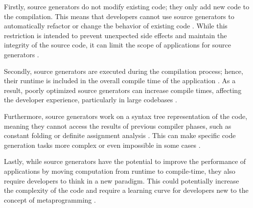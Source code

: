 Firstly, source generators do not modify existing code; they only add new code to the compilation. This means that developers cannot use source generators to automatically refactor or change the behavior of existing code \cite{CSharpRoslyn}. While this restriction is intended to prevent unexpected side effects and maintain the integrity of the source code, it can limit the scope of applications for source generators \cite{Carter2020}.

Secondly, source generators are executed during the compilation process; hence, their runtime is included in the overall compile time of the application \cite{CSharpRoslyn}. As a result, poorly optimized source generators can increase compile times, affecting the developer experience, particularly in large codebases \cite{Carter2020}.

Furthermore, source generators work on a syntax tree representation of the code, meaning they cannot access the results of previous compiler phases, such as constant folding or definite assignment analysis \cite{Torgersen2020}. This can make specific code generation tasks more complex or even impossible in some cases \cite{CSharpRoslyn}.

Lastly, while source generators have the potential to improve the performance of applications by moving computation from runtime to compile-time, they also require developers to think in a new paradigm. This could potentially increase the complexity of the code and require a learning curve for developers new to the concept of metaprogramming \cite{CSharpRoslyn}.